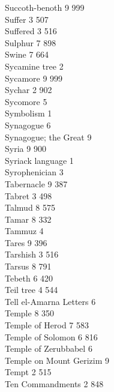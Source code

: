 Succoth-benoth \hfill 9 \quad \phantom{0}999\\
Suffer \hfill 3 \quad \phantom{0}507\\
Suffered \hfill 3 \quad \phantom{0}516\\
Sulphur \hfill 7 \quad \phantom{0}898\\
Swine \hfill 7 \quad \phantom{0}664\\
Sycamine tree \hfill 2 \\
Sycamore \hfill 9 \quad \phantom{0}999\\
Sychar \hfill 2 \quad \phantom{0}902\\
Sycomore \hfill 5 \\
Symbolism \hfill 1 \\
Synagogue \hfill 6 \\
Synagogue; the Great \hfill 9 \\
Syria \hfill 9 \quad \phantom{0}900\\
Syriack language \hfill 1 \\
Syrophenician \hfill 3 \\
Tabernacle \hfill 9 \quad \phantom{0}387\\
Tabret \hfill 3 \quad \phantom{0}498\\
Talmud \hfill 8 \quad \phantom{0}575\\
Tamar \hfill 8 \quad \phantom{0}332\\
Tammuz \hfill 4 \\
Tares \hfill 9 \quad \phantom{0}396\\
Tarshish \hfill 3 \quad \phantom{0}516\\
Tarsus \hfill 8 \quad \phantom{0}791\\
Tebeth \hfill 6 \quad \phantom{0}420\\
Teil tree \hfill 4 \quad \phantom{0}544\\
Tell el-Amarna Letters \hfill 6 \\
Temple \hfill 8 \quad \phantom{0}350\\
Temple of Herod \hfill 7 \quad \phantom{0}583\\
Temple of Solomon \hfill 6 \quad \phantom{0}816\\
Temple of Zerubbabel \hfill 6 \\
Temple on Mount Gerizim \hfill 9 \\
Tempt \hfill 2 \quad \phantom{0}515\\
Ten Commandments \hfill 2 \quad \phantom{0}848\\
